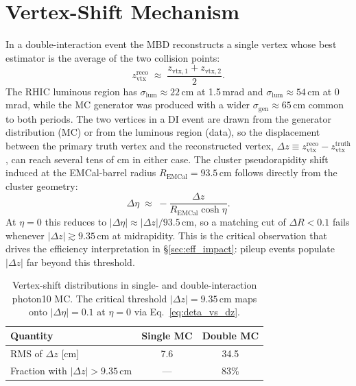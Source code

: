 \documentclass[11pt,a4paper]{article}
\newcommand{\DR}{\ensuremath{\Delta R}\xspace}
\begin{document}
\section{Vertex-Shift Mechanism}
\label{sec:vtx_shift}

In a double-interaction event the MBD reconstructs a single vertex
whose best estimator is the average of the two collision points:
\begin{equation}
    z_{\text{vtx}}^{\text{reco}} \;\approx\; \frac{z_{\text{vtx},1} + z_{\text{vtx},2}}{2}.
\end{equation}
The RHIC luminous region has $\sigma_\mathrm{lum} \approx 22$\,cm at
1.5\,mrad and $\sigma_\mathrm{lum} \approx 54$\,cm at 0\,mrad, while
the MC generator was produced with a wider
$\sigma_\mathrm{gen} \approx 65$\,cm common to both periods. The
two vertices in a DI event are drawn from the generator distribution
(MC) or from the luminous region (data), so the displacement between
the primary truth vertex and the reconstructed vertex,
$\Delta z \equiv z_{\text{vtx}}^{\text{reco}} - z_{\text{vtx}}^{\text{truth}}$,
can reach several tens of cm in either case. The cluster pseudorapidity shift induced at
the EMCal-barrel radius $R_{\text{EMCal}} = 93.5$\,cm follows directly
from the cluster geometry:
\begin{equation}
    \Delta\eta \;\approx\; -\frac{\Delta z}{R_{\text{EMCal}} \cosh\eta}.
    \label{eq:deta_vs_dz}
\end{equation}
At $\eta = 0$ this reduces to $|\Delta\eta| \approx |\Delta z|/93.5$\,cm,
so a matching cut of $\DR<0.1$ fails whenever
$|\Delta z| \gtrsim 9.35$\,cm at midrapidity. This is the critical
observation that drives the efficiency interpretation in
\S\ref{sec:eff_impact}: pileup events populate $|\Delta z|$ far beyond
this threshold.

\begin{table}[H]
    \centering
    \caption{Vertex-shift distributions in single- and double-interaction
      photon10 MC. The critical threshold $|\Delta z| = 9.35$\,cm maps
      onto $|\Delta\eta| = 0.1$ at $\eta = 0$ via
      Eq.~\eqref{eq:deta_vs_dz}.}
    \label{tab:vertex_shift}
    \begin{tabular}{lcc}
        \toprule
        Quantity & Single MC & Double MC \\
        \midrule
        RMS of $\Delta z$ [cm] & 7.6 & 34.5 \\
        Fraction with $|\Delta z| > 9.35$\,cm & --- & 83\% \\
        \bottomrule
    \end{tabular}
\end{table}
\end{document}

